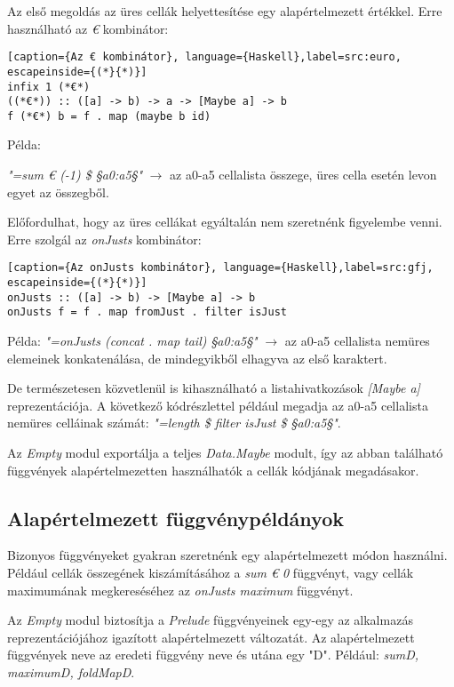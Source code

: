Az első megoldás az üres cellák helyettesítése egy alapértelmezett értékkel. Erre használható az \textit{€} kombinátor:

\begin{lstlisting}[caption={Az € kombinátor}, language={Haskell},label=src:euro, escapeinside={(*}{*)}]
infix 1 (*€*)
((*€*)) :: ([a] -> b) -> a -> [Maybe a] -> b
f (*€*) b = f . map (maybe b id)
\end{lstlisting}

Példa:

\textit{"=sum € (-1) \$ §a0:a5§"} $\rightarrow$ az a0-a5 cellalista összege, üres cella esetén levon egyet az összegből.

Előfordulhat, hogy az üres cellákat egyáltalán nem szeretnénk figyelembe venni. Erre szolgál az \textit{onJusts} kombinátor:

\begin{lstlisting}[caption={Az onJusts kombinátor}, language={Haskell},label=src:gfj, escapeinside={(*}{*)}]
onJusts :: ([a] -> b) -> [Maybe a] -> b
onJusts f = f . map fromJust . filter isJust 
\end{lstlisting}

Példa:
\textit{"=onJusts (concat . map tail) §a0:a5§"} $\rightarrow$ az a0-a5 cellalista nemüres elemeinek konkatenálása, de mindegyikből elhagyva az első karaktert.

De természetesen közvetlenül is kihasználható a listahivatkozások \textit{[Maybe a]} reprezentációja. A következő kódrészlettel például megadja az a0-a5 cellalista nemüres celláinak számát: \textit{"=length \$ filter isJust \$ §a0:a5§"}.

Az \textit{Empty} modul exportálja a teljes \textit{Data.Maybe} modult, így az abban található függvények alapértelmezetten használhatók a cellák kódjának megadásakor.

\subsection{Alapértelmezett függvénypéldányok}

Bizonyos függvényeket gyakran szeretnénk egy alapértelmezett módon használni. Például cellák összegének kiszámításához a \textit{sum € 0} függvényt, vagy cellák maximumának megkereséséhez az \textit{onJusts maximum} függvényt.

Az \textit{Empty} modul biztosítja a \textit{Prelude} függvényeinek egy-egy az alkalmazás reprezentációjához igazított alapértelmezett változatát. Az alapértelmezett függvények neve az eredeti függvény neve és utána egy "D". Például: \textit{sumD, maximumD, foldMapD}.

